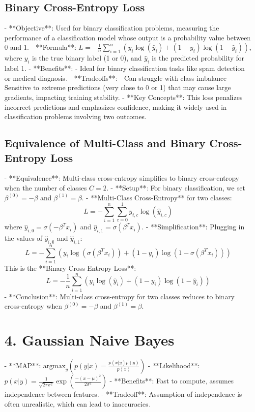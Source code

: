 \documentclass[10pt]{article}
\begin{document}
\begin{multicols}{2}
\subsection*{Binary Cross-Entropy Loss}
- **Objective**: Used for binary classification problems, measuring the performance of a classification model whose output is a probability value between 0 and 1.
- **Formula**: $L = -\frac{1}{n} \sum_{i=1}^{n} \left( y_i \log(\hat{y}_i) + (1 - y_i) \log(1 - \hat{y}_i) \right)$, where $y_i$ is the true binary label (1 or 0), and $\hat{y}_i$ is the predicted probability for label 1.
- **Benefits**:
  - Ideal for binary classification tasks like spam detection or medical diagnosis.
- **Tradeoffs**:
  - Can struggle with class imbalance
  - Sensitive to extreme predictions (very close to 0 or 1) that may cause large gradients, impacting training stability.
- **Key Concepts**: This loss penalizes incorrect predictions and emphasizes confidence, making it widely used in classification problems involving two outcomes.

\subsection*{Equivalence of Multi-Class and Binary Cross-Entropy Loss}
- **Equivalence**: Multi-class cross-entropy simplifies to binary cross-entropy when the number of classes $C = 2$.
- **Setup**: For binary classification, we set $\beta^{(0)} = -\beta$ and $\beta^{(1)} = \beta$.
- **Multi-Class Cross-Entropy** for two classes:
  \[
  L = -\sum_{i=1}^{n} \sum_{c=0}^{1} y_{i,c} \log(\hat{y}_{i,c})
  \]
  where $\hat{y}_{i,0} = \sigma(-\beta^T x_i)$ and $\hat{y}_{i,1} = \sigma(\beta^T x_i)$.
- **Simplification**: Plugging in the values of $\hat{y}_{i,0}$ and $\hat{y}_{i,1}$:
  \[
  L = -\sum_{i=1}^{n} \left( y_i \log(\sigma(\beta^T x_i)) + (1 - y_i) \log(1 - \sigma(\beta^T x_i)) \right)
  \]
  This is the **Binary Cross-Entropy Loss**:
  \[
  L = -\frac{1}{n} \sum_{i=1}^{n} \left( y_i \log(\hat{y}_i) + (1 - y_i) \log(1 - \hat{y}_i) \right)
  \]
- **Conclusion**: Multi-class cross-entropy for two classes reduces to binary cross-entropy when $\beta^{(0)} = -\beta$ and $\beta^{(1)} = \beta$.


\section*{4. Gaussian Naive Bayes}
- **MAP**: $\text{argmax}_y \left( p(y|x) = \frac{p(x|y)p(y)}{p(x)} \right)$
- **Likelihood**: $p(x|y) = \frac{1}{\sqrt{2\pi\sigma^2}} \exp\left(\frac{-(x-\mu)^2}{2\sigma^2}\right)$
- **Benefits**: Fast to compute, assumes independence between features.
- **Tradeoff**: Assumption of independence is often unrealistic, which can lead to inaccuracies.


\end{multicols}
\end{document}
